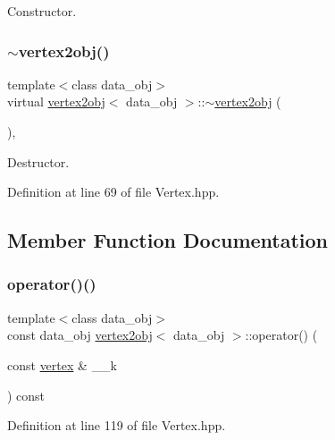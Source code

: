 Constructor. 

\mbox{\label{structvertex2obj_a47020e1346f41dbcec36d0c534c37747}} 
\subsubsection{\texorpdfstring{$\sim$vertex2obj()}{~vertex2obj()}}
{\footnotesize\ttfamily template$<$class data\+\_\+obj$>$ \\
virtual \hyperlink{structvertex2obj}{vertex2obj}$<$ data\+\_\+obj $>$\+::$\sim$\hyperlink{structvertex2obj}{vertex2obj} (\begin{DoxyParamCaption}{ }\end{DoxyParamCaption})\hspace{0.3cm}{\ttfamily [inline]}, {\ttfamily [virtual]}}



Destructor. 



Definition at line 69 of file Vertex.\+hpp.



\subsection{Member Function Documentation}
\mbox{\label{structvertex2obj_a3a10959d65d03b1c6b81b859e48426dd}} 
\subsubsection{\texorpdfstring{operator()()}{operator()()}}
{\footnotesize\ttfamily template$<$class data\+\_\+obj$>$ \\
const data\+\_\+obj \hyperlink{structvertex2obj}{vertex2obj}$<$ data\+\_\+obj $>$\+::operator() (\begin{DoxyParamCaption}\item[{const \hyperlink{graph_8hpp_abefdcf0544e601805af44eca032cca14}{vertex} \&}]{\+\_\+\+\_\+k }\end{DoxyParamCaption}) const\hspace{0.3cm}{\ttfamily [inline]}}



Definition at line 119 of file Vertex.\+hpp.

